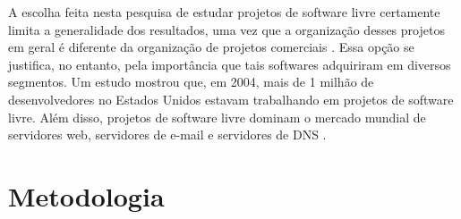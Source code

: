 \documentclass{article}
\begin{document}
A escolha feita nesta pesquisa de estudar projetos de software livre certamente
limita a generalidade dos resultados, uma vez que a organização desses projetos
em geral é diferente da organização de projetos comerciais \cite{raymond2001}.
Essa opção se justifica, no entanto, pela importância que tais softwares
adquiriram em diversos segmentos.  Um estudo mostrou que, em 2004, mais de 1
milhão de desenvolvedores no Estados Unidos estavam trabalhando em projetos de
software livre. Além disso, projetos de software livre dominam o mercado mundial
de servidores web, servidores de e-mail e servidores de DNS \cite{wheeler2007}.

%





\section{Metodologia}

\end{document}
